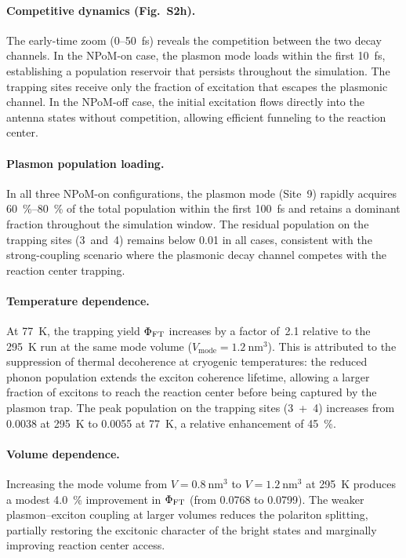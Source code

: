 \documentclass[11pt,a4paper]{article}
\begin{document}
\paragraph{Competitive dynamics (Fig.~S2h).} The early-time zoom (0--\qty{50}{\fs}) reveals the competition between the two decay channels. In the NPoM-on case, the plasmon mode loads within the first \qty{10}{\fs}, establishing a population reservoir that persists throughout the simulation. The trapping sites receive only the fraction of excitation that escapes the plasmonic channel. In the NPoM-off case, the initial excitation flows directly into the antenna states without competition, allowing efficient funneling to the reaction center.

\paragraph{Plasmon population loading.} In all three NPoM-on configurations, the plasmon mode (Site~9) rapidly acquires \qty{60}{\percent}--\qty{80}{\percent} of the total population within the first \qty{100}{\fs} and retains a dominant fraction throughout the simulation window. The residual population on the trapping sites (3~and~4) remains below \num{0.01} in all cases, consistent with the strong-coupling scenario where the plasmonic decay channel competes with the reaction center trapping.

\paragraph{Temperature dependence.} \label{SI-sec:cryo} At \qty{77}{\kelvin}, the trapping yield $\Phi_{\rm FT}$ increases by a factor of~2.1 relative to the \qty{295}{\kelvin} run at the same mode volume ($V_{\mathrm{mode}} = \qty{1.2}{\nm\cubed}$). This is attributed to the suppression of thermal decoherence at cryogenic temperatures: the reduced phonon population extends the exciton coherence lifetime, allowing a larger fraction of excitons to reach the reaction center before being captured by the plasmon trap. The peak population on the trapping sites (3~+~4) increases from \num{0.0038} at \qty{295}{\kelvin} to \num{0.0055} at \qty{77}{\kelvin}, a relative enhancement of \qty{45}{\percent}.

\paragraph{Volume dependence.} Increasing the mode volume from $V = \qty{0.8}{\nm\cubed}$ to $V = \qty{1.2}{\nm\cubed}$ at \qty{295}{\kelvin} produces a modest \qty{4.0}{\percent} improvement in $\Phi_{\rm FT}$ (from \num{0.0768} to \num{0.0799}). The weaker plasmon--exciton coupling at larger volumes reduces the polariton splitting, partially restoring the excitonic character of the bright states and marginally improving reaction center access.
\end{document}
